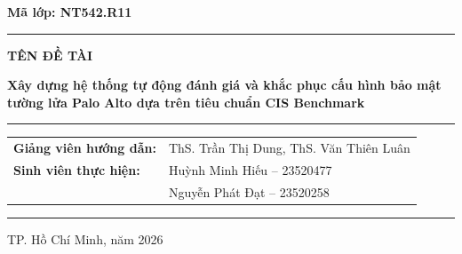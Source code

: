 \documentclass[12pt,a4paper]{article}
\renewcommand{\arraystretch}{1.3}
\begin{document}
\begin{titlepage}
\begin{center}
    {\large
    \textbf{Mã lớp: NT542.R11}
    \par}

    \vspace{0.28cm}

    {\color{UITBlue}
    \rule{0.85\textwidth}{0.7pt}
    }

    \vspace{0.28cm}

    {\large\bfseries
    TÊN ĐỀ TÀI
    \par}

    \vspace{0.20cm}

    \begin{minipage}{0.92\textwidth}
        \centering
        {\Large\bfseries\color{UITBlue}
        Xây dựng hệ thống tự động đánh giá và khắc phục cấu hình bảo mật tường lửa Palo Alto dựa trên tiêu chuẩn CIS Benchmark
        \par}
    \end{minipage}

    \vspace{0.28cm}

    {\color{UITBlue}
    \rule{0.85\textwidth}{0.7pt}
    }

    \vspace{0.4cm}

    \begin{minipage}{0.95\textwidth}

        \renewcommand{\arraystretch}{1.6}

        \begin{tabular}{@{}p{5cm}l@{}}

            \textbf{Giảng viên hướng dẫn:}
            & ThS. Trần Thị Dung, ThS. Văn Thiên Luân \\

            \textbf{Sinh viên thực hiện:}
            & Huỳnh Minh Hiếu -- 23520477 \\

            & Nguyễn Phát Đạt -- 23520258 \\

        \end{tabular}

    \end{minipage}
    \vfill
    {\color{UITBlue}\rule{0.65\textwidth}{0.6pt}}\par
    \vspace{0.20cm}
    {\normalsize TP. Hồ Chí Minh, năm 2026\par}
\end{center}
\end{titlepage}
\end{document}
